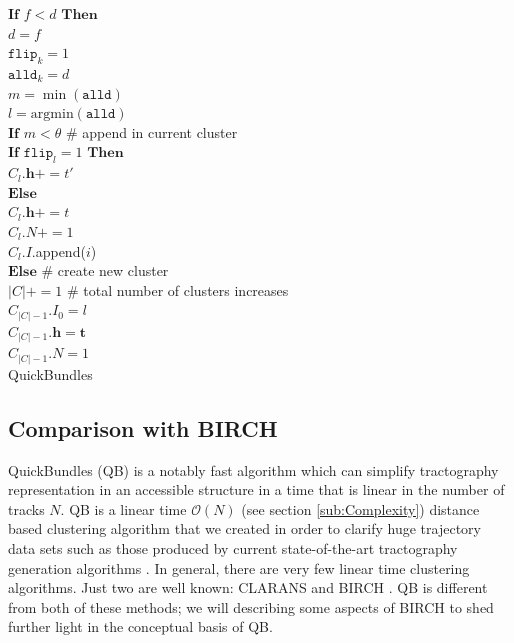 \documentclass[preprint,authoryear,a4paper,10pt,onecolumn]{elsarticle}
\begin{document}
\begin{appendices}
\begin{algorithm}
\hspace*{4em} $\textbf{If}$ $f < d$ $\textbf{Then}$\\
\hspace*{6em} $d = f$\\
\hspace*{6em} $\texttt{flip}_{k} = 1$\\
\hspace*{4em} $\texttt{alld}_{k} = d$\\
$m=\min(\texttt{alld})$\\
$l=\mathrm{arg min}(\texttt{alld})$\\
$\textbf{If}$ $m < \theta$ \# append in current cluster \\
\hspace*{2em} $\textbf{If}$ $\texttt{flip}_{l}=1$ $\textbf{Then}$\\
\hspace*{4em} $C_{l}.\mathbf{h}+=t'$\\
\hspace*{2em} $\textbf{Else}$ \\
\hspace*{4em} $C_{l}.\mathbf{h}+=t$\\
\hspace*{2em} $C_{l}.N+=1$\\
\hspace*{2em} $C_{l}.I$.append($i$)\\
$\textbf{Else}$ \# create new cluster\\
\hspace*{2em} $|C|+=1$ \# total number of clusters increases\\
\hspace*{2em} $C_{|C|-1}.I_{0}=l$\\
\hspace*{2em} $C_{|C|-1}.\mathbf{h}=\mathbf{t}$\\
\hspace*{2em} $C_{|C|-1}.N=1$\\
\caption{QuickBundles\label{Alg:QuickBundles}}
\end{algorithm}

\subsection{Comparison with BIRCH\label{sub:BIRCH}}

QuickBundles (QB) is a notably fast algorithm which can simplify
tractography representation in an accessible structure in a time that is
linear in the number of tracks $N$. QB is a linear time $\mathcal{O}(N)$ (see
section \ref{sub:Complexity}) distance based clustering algorithm that
we created in order to clarify huge trajectory data sets such as those
produced by current state-of-the-art tractography generation algorithms
\citep{Parker2003,WWS+08}. In general, there are very few linear time
clustering algorithms. Just two are well known: CLARANS
\citep{ng2002clarans} and BIRCH \citep{zhang1997birch}. QB is different
from both of these methods; we will describing some
aspects of BIRCH to shed further light in the conceptual basis of QB.


\end{appendices}
\end{document}
